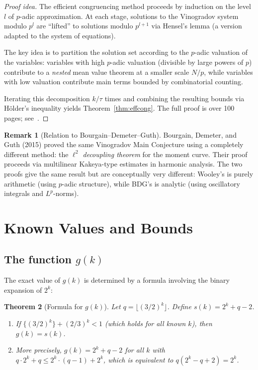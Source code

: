 \documentclass[12pt,a4paper]{amsart}
\newtheorem{theorem}{Theorem}[section]
\theoremstyle{definition}
\newtheorem{remark}[theorem]{Remark}
\begin{document}
\begin{proof}[Proof idea]
  The efficient congruencing method proceeds by induction on the level $l$
  of $p$-adic approximation.  At each stage, solutions to the Vinogradov
  system modulo $p^l$ are ``lifted'' to solutions modulo $p^{l+1}$ via
  Hensel's lemma (a version adapted to the system of equations).

  The key idea is to partition the solution set according to the $p$-adic
  valuation of the variables: variables with high $p$-adic valuation
  (divisible by large powers of $p$) contribute to a \emph{nested}
  mean value theorem at a smaller scale $N/p$, while variables with
  low valuation contribute main terms bounded by combinatorial counting.

  Iterating this decomposition $k/\tau$ times and combining the resulting
  bounds via H\"older's inequality yields Theorem~\ref{thm:effcong}.  The
  full proof is over 100 pages; see~\cite{Wooley2016}.
\end{proof}

\begin{remark}[Relation to Bourgain--Demeter--Guth]
  Bourgain, Demeter, and Guth (2015) proved the same Vinogradov Main
  Conjecture using a completely different method: the \emph{$\ell^2$ decoupling
  theorem} for the moment curve.  Their proof proceeds via multilinear
  Kakeya-type estimates in harmonic analysis.  The two proofs give the
  same result but are conceptually very different: Wooley's is purely
  arithmetic (using $p$-adic structure), while BDG's is analytic
  (using oscillatory integrals and $L^p$-norms).
\end{remark}

\section{Known Values and Bounds}
\label{sec:table}

\subsection{The function $g(k)$}

The exact value of $g(k)$ is determined by a formula involving the
binary expansion of $2^k$:

\begin{theorem}[Formula for $g(k)$]\label{thm:gk_formula}
  Let $q = \lfloor (3/2)^k \rfloor$.  Define $s(k) = 2^k + q - 2$.
  \begin{enumerate}
    \item If $\{(3/2)^k\} + (2/3)^k < 1$ (which holds for all known $k$),
      then $g(k) = s(k)$.
    \item More precisely, $g(k) = 2^k + q - 2$ for all $k$ with
      $q \cdot 2^k + q \leq 2^k \cdot (q-1) + 2^k$, which is
      equivalent to $q(2^k - q + 2) = 2^k$.
  \end{enumerate}
\end{theorem}
\end{document}
